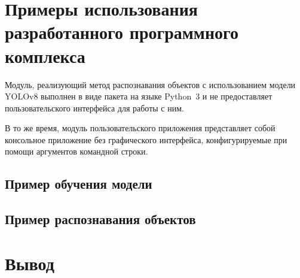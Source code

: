 \section{Примеры использования разработанного программного комплекса}

Модуль, реализующий метод распознавания объектов с использованием модели YOLOv8 выполнен в виде пакета на языке Python~3 и не предоставляет пользовательского интерфейса для работы с ним.

В то же время, модуль пользовательского приложения представляет собой  консольное приложение без графического интерфейса, конфигурируемые при помощи аргументов командной строки.

\subsection{Пример обучения модели}



\subsection{Пример распознавания объектов}



\section{Вывод}